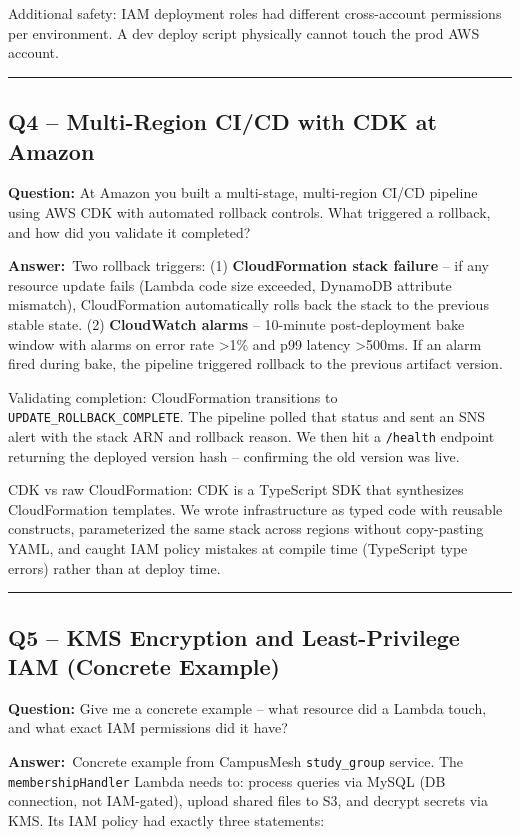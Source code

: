 \documentclass[letterpaper,10pt]{article}
\newlength{\boxwidth}
\newcommand{\questionbox}[1]{%
  \vspace{6pt}%
  \noindent\colorbox{qbg}{%
    \begin{minipage}{\boxwidth}%
      \vspace{3pt}\textbf{\textcolor{nordblue}{Question:}} #1\vspace{3pt}%
    \end{minipage}%
  }\vspace{2pt}%
}
\newcommand{\answerlabel}{\noindent\textbf{\textcolor{answerblue}{Answer:}}~}
\begin{document}
Additional safety: IAM deployment roles had different cross-account permissions per environment. A dev deploy script physically cannot touch the prod AWS account.

\medskip\rule{\linewidth}{0.2pt}

\subsection*{Q4 -- Multi-Region CI/CD with CDK at Amazon}

\questionbox{At Amazon you built a multi-stage, multi-region CI/CD pipeline using AWS CDK with automated rollback controls. What triggered a rollback, and how did you validate it completed?}

\answerlabel Two rollback triggers: (1) \textbf{CloudFormation stack failure} -- if any resource update fails (Lambda code size exceeded, DynamoDB attribute mismatch), CloudFormation automatically rolls back the stack to the previous stable state. (2) \textbf{CloudWatch alarms} -- 10-minute post-deployment bake window with alarms on error rate \textgreater{}1\% and p99 latency \textgreater{}500ms. If an alarm fired during bake, the pipeline triggered rollback to the previous artifact version.

Validating completion: CloudFormation transitions to \texttt{UPDATE\_ROLLBACK\_COMPLETE}. The pipeline polled that status and sent an SNS alert with the stack ARN and rollback reason. We then hit a \texttt{/health} endpoint returning the deployed version hash -- confirming the old version was live.

CDK vs raw CloudFormation: CDK is a TypeScript SDK that synthesizes CloudFormation templates. We wrote infrastructure as typed code with reusable constructs, parameterized the same stack across regions without copy-pasting YAML, and caught IAM policy mistakes at compile time (TypeScript type errors) rather than at deploy time.

\medskip\rule{\linewidth}{0.2pt}

\subsection*{Q5 -- KMS Encryption and Least-Privilege IAM (Concrete Example)}

\questionbox{Give me a concrete example -- what resource did a Lambda touch, and what exact IAM permissions did it have?}

\answerlabel Concrete example from CampusMesh \texttt{study\_group} service. The \texttt{membershipHandler} Lambda needs to: process queries via MySQL (DB connection, not IAM-gated), upload shared files to S3, and decrypt secrets via KMS. Its IAM policy had exactly three statements:
\end{document}
